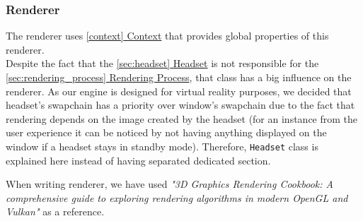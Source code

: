 \subsubsection{Renderer}
\label{sec:renderer}
\hspace{\parindent} The renderer uses \hyperref[context]{\ref*{context} Context} that provides global properties of this renderer.\\
Despite the fact that the \hyperref[sec:headset]{\ref*{sec:headset} Headset} is not responsible for the \hyperref[sec:rendering_process]{\ref*{sec:rendering_process} Rendering Process}, that class has a big influence on the renderer. As our engine is designed for virtual reality purposes, we decided that headset's swapchain has a priority over window's swapchain due to the fact that rendering depends on the image created by the headset (for an instance from the user experience it can be noticed by not having anything displayed on the window if a headset stays in standby mode). Therefore, \texttt{Headset} class is explained here instead of having separated dedicated section.

When writing renderer, we have used \textit{"3D Graphics Rendering Cookbook: A comprehensive guide to exploring rendering algorithms in modern OpenGL and Vulkan"} \cite{3DGraphicsRenderingCookbook} as a reference.

